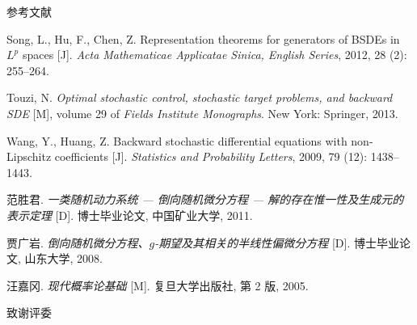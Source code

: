 \documentclass[xcolor=svgnames,serif,table,10pt]{beamer}
\begin{document}
\begin{frame}[allowframebreaks]{参考文献}
\begin{thebibliography}{57}
Song, L., Hu, F., Chen, Z.
\newblock Representation theorems for generators of {BSDE}s in ${L}^p$
  spaces [J].
\newblock \emph{Acta Mathematicae Applicatae Sinica, English Series}, 2012,
  28 (2): 255--264.

Touzi, N.
\newblock \emph{Optimal stochastic control, stochastic target problems, and
  backward {SDE}} [M], volume 29 of \emph{Fields Institute Monographs}.
\newblock New York: Springer, 2013.

Wang, Y., Huang, Z.
\newblock Backward stochastic differential equations with non-{L}ipschitz
  coefficients [J].
\newblock \emph{Statistics and Probability Letters}, 2009, 79
  (12): 1438--1443.

{\beamertemplatebookbibitems
{}
范胜君.
\newblock
  \emph{一类随机动力系统 --- 倒向随机微分方程 --- 解的存在惟一性及生成元的表示定理} [D].
\newblock 博士毕业论文, 中国矿业大学, 2011.}

{\beamertemplatebookbibitems
{}
贾广岩.
\newblock \emph{倒向随机微分方程、$g$-期望及其相关的半线性偏微分方程} [D].
\newblock 博士毕业论文, 山东大学, 2008.}



{\beamertemplatebookbibitems
{}
汪嘉冈.
\newblock \emph{现代概率论基础} [M].
\newblock 复旦大学出版社, 第 2 版, 2005.}

\end{thebibliography}
\end{frame}

\begin{frame}{致谢评委}
  \begin{center}
  \end{center}
\end{frame}
\end{document}
